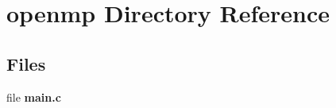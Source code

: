 \section{openmp Directory Reference}
\label{dir_d55b8491c3a07b955e5ddb910bb8058f}
\subsection*{Files}
\begin{DoxyCompactItemize}
\item 
file {\bf main.\+c}
\end{DoxyCompactItemize}
